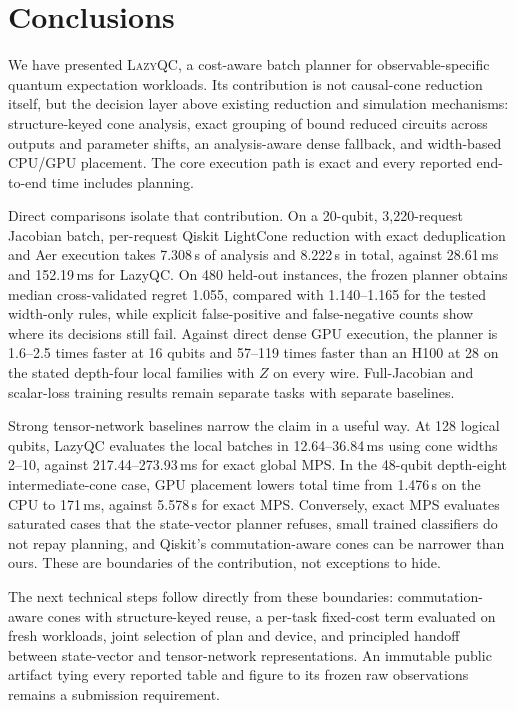 \section{Conclusions}
\label{sec:conclusion}
We have presented \textsc{LazyQC}, a cost-aware batch planner for observable-specific quantum expectation workloads. Its contribution is not causal-cone reduction itself, but the decision layer above existing reduction and simulation mechanisms: structure-keyed cone analysis, exact grouping of bound reduced circuits across outputs and parameter shifts, an analysis-aware dense fallback, and width-based CPU/GPU placement. The core execution path is exact and every reported end-to-end time includes planning.

Direct comparisons isolate that contribution. On a 20-qubit, 3,220-request Jacobian batch, per-request Qiskit LightCone reduction with exact deduplication and Aer execution takes 7.308\,s of analysis and 8.222\,s in total, against 28.61\,ms and 152.19\,ms for LazyQC. On 480 held-out instances, the frozen planner obtains median cross-validated regret 1.055, compared with 1.140--1.165 for the tested width-only rules, while explicit false-positive and false-negative counts show where its decisions still fail. Against direct dense GPU execution, the planner is 1.6--2.5 times faster at 16 qubits and 57--119 times faster than an H100 at 28 on the stated depth-four local families with $Z$ on every wire. Full-Jacobian and scalar-loss training results remain separate tasks with separate baselines.

Strong tensor-network baselines narrow the claim in a useful way. At 128 logical qubits, LazyQC evaluates the local batches in 12.64--36.84\,ms using cone widths 2--10, against 217.44--273.93\,ms for exact global MPS. In the 48-qubit depth-eight intermediate-cone case, GPU placement lowers total time from 1.476\,s on the CPU to 171\,ms, against 5.578\,s for exact MPS. Conversely, exact MPS evaluates saturated cases that the state-vector planner refuses, small trained classifiers do not repay planning, and Qiskit's commutation-aware cones can be narrower than ours. These are boundaries of the contribution, not exceptions to hide.

The next technical steps follow directly from these boundaries: commutation-aware cones with structure-keyed reuse, a per-task fixed-cost term evaluated on fresh workloads, joint selection of plan and device, and principled handoff between state-vector and tensor-network representations. An immutable public artifact tying every reported table and figure to its frozen raw observations remains a submission requirement.
